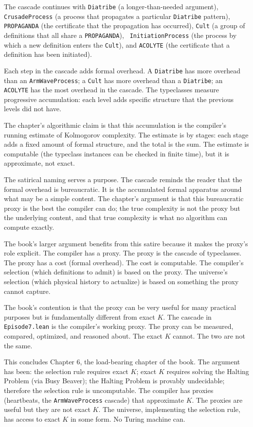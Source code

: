 The cascade continues with \texttt{Diatribe} (a longer-than-needed
argument), \texttt{CrusadeProcess} (a process that propagates a
particular \texttt{Diatribe} pattern), \texttt{PROPAGANDA} (the
certificate that the propagation has occurred), \texttt{Cult} (a
group of definitions that all share a \texttt{PROPAGANDA}), \texttt{
InitiationProcess} (the process by which a new definition enters
the \texttt{Cult}), and \texttt{ACOLYTE} (the certificate that a
definition has been initiated).

Each step in the cascade adds formal overhead. A \texttt{Diatribe}
has more overhead than an \texttt{ArmWaveProcess}; a
\texttt{Cult} has more overhead than a \texttt{Diatribe}; an
\texttt{ACOLYTE} has the most overhead in the cascade. The
typeclasses measure progressive accumulation: each level adds
specific structure that the previous levels did not have.

The chapter's algorithmic claim is that this accumulation is the
compiler's running estimate of Kolmogorov complexity. The
estimate is by stages: each stage adds a fixed amount of
formal structure, and the total is the sum. The estimate is
computable (the typeclass instances can be checked in finite
time), but it is approximate, not exact.

The satirical naming serves a purpose. The cascade reminds the
reader that the formal overhead is bureaucratic. It is the
accumulated formal apparatus around what may be a simple
content. The chapter's argument is that this bureaucratic
proxy is the best the compiler can do; the true complexity is
not the proxy but the underlying content, and that true
complexity is what no algorithm can compute exactly.

The book's larger argument benefits from this satire because it
makes the proxy's role explicit. The compiler has a proxy. The
proxy is the cascade of typeclasses. The proxy has a cost
(formal overhead). The cost is computable. The compiler's
selection (which definitions to admit) is based on the proxy.
The universe's selection (which physical history to actualize)
is based on something the proxy cannot capture.

The book's contention is that the proxy can be very useful for
many practical purposes but is fundamentally different from
exact $K$. The cascade in \texttt{Episode7.lean} is the
compiler's working proxy. The proxy can be measured, compared,
optimized, and reasoned about. The exact $K$ cannot. The two
are not the same.

This concludes Chapter 6, the load-bearing chapter of the book.
The argument has been: the selection rule requires exact $K$;
exact $K$ requires solving the Halting Problem (via Busy
Beaver); the Halting Problem is provably undecidable; therefore
the selection rule is uncomputable. The compiler has proxies
(heartbeats, the \texttt{ArmWaveProcess} cascade) that
approximate $K$. The proxies are useful but they are not exact
$K$. The universe, implementing the selection rule, has access
to exact $K$ in some form. No Turing machine can.

